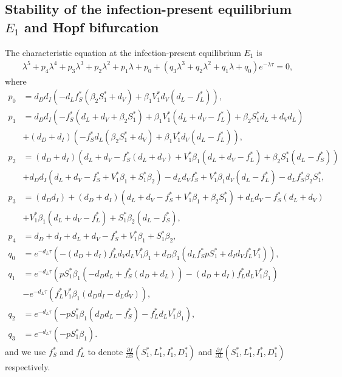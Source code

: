 \documentclass{CMHPhD-SIVD}
\begin{document}
\subsection{Stability of the infection-present equilibrium $E_1$ and Hopf bifurcation}\label{3.3}
The characteristic equation at the infection-present equilibrium $E_1$ is
\begin{equation}\label{9}
   \begin{array}{ll}
   \lambda^5+ p_4\lambda^4+p_3 \lambda^3+p_2 \lambda^2+p_1 \lambda+p_0+(q_3 \lambda^3+q_2 \lambda^2+q_1 \lambda+q_0)e^{-\lambda \tau}=0,
   \end{array}
\end{equation}
where
\begin{align*}
p_0&=d_D d_I\left(-d_Lf_S^*(\beta_2 S_1^*+d_{V})+ \beta_1 V_1^*d_V(d_L-f_L^*)\right),\\
p_1&=d_D d_I \left(-f_S^*(d_L+d_V+\beta_2 S_1^*) + \beta_1 V_1^*(d_L+d_V-f_L^*)+\beta_2 S_1^*d_L+d_{V}d_L\right) \nonumber \\
& + (d_D + d_I) \left(-f_S^*d_L(\beta_2 S_1^*+d_{V})+ \beta_1 V_1^*d_V(d_L-f_L^*)\right), \\
p_2&=(d_D+ d_I) \left(d_L+ d_V-f_S^*(d_L+ d_V)+V_1^*\beta_1(d_L+ d_V-f_L^*)+ \beta_2 S_1^*(d_L-f_S^*)\right)\nonumber \\
&+d_D d_I(d_L+ d_V-f_S^*+V_1^*\beta_1+S_1^*\beta_2)- d_Ld_Vf_S^* +V_1^*\beta_1 d_V(d_L-f_L^*)-d_Lf_S^*\beta_2 S_1^*, \\
p_3&=(d_D d_I)+(d_D + d_I)(d_L + d_V -f_S^*+V_1^*\beta_1+\beta_2 S_1^*)+d_L d_V-f_S^*(d_L + d_V)\nonumber \\
&+V_1^*\beta_1(d_L + d_V-f_L^*)+S_1^*\beta_2(d_L-f_S^*), \\
p_4&=d_D+d_I+d_L +d_V-f_S^*+V_1^*\beta_1+S_1^*\beta_2,\\
q_0&=e^{-d_L\tau}\left(- (d_D+ d_I)f_L^* d_Vd_L V_1^* \beta_1+d_D\beta_1(d_Lf_S^* p S_1^*+d_Id_Vf_L^*V_1^*)\right),\\
q_1&=e^{-d_L\tau}\left( p S_1^* \beta_1(-d_Dd_L+f_S^*(d_D+d_L)) - (d_D+
d_I) f_L^* d_L V_1^* \beta_1\right)\nonumber \\
&-e^{-d_L\tau}\left(f_L^* V_1^* \beta_1(d_D
d_I-d_L
d_V)\right),\\
q_2&=e^{-d_L\tau}\left(-p S_1^* \beta_1(d_D
d_L-f_S^*)-f_L^* d_L V_1^* \beta_1\right),\\
q_3&=e^{-d_L\tau}\left(-p S_1^*\beta_1\right).
\end{align*}
and we use $f_S^*$ and $f_L^*$ to denote $\frac{\partial f}{\partial S}(S_1^*, L_1^*, I_1^*, D_1^*)$ and $\frac{\partial f}{\partial L}(S_1^*, L_1^*, I_1^*, D_1^*)$ respectively.
\end{document}
